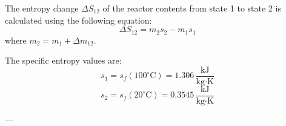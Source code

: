 The entropy change \( \Delta S_{12} \) of the reactor contents from state 1 to state 2 is calculated using the following equation:  
\[
\Delta S_{12} = m_2 s_2 - m_1 s_1
\]  
where \( m_2 = m_1 + \Delta m_{12} \).  

The specific entropy values are:  
\[
s_1 = s_f(100^\circ\text{C}) = 1.306 \, \frac{\text{kJ}}{\text{kg·K}}
\]  
\[
s_2 = s_f(20^\circ\text{C}) = 0.3545 \, \frac{\text{kJ}}{\text{kg·K}}
\]  

---